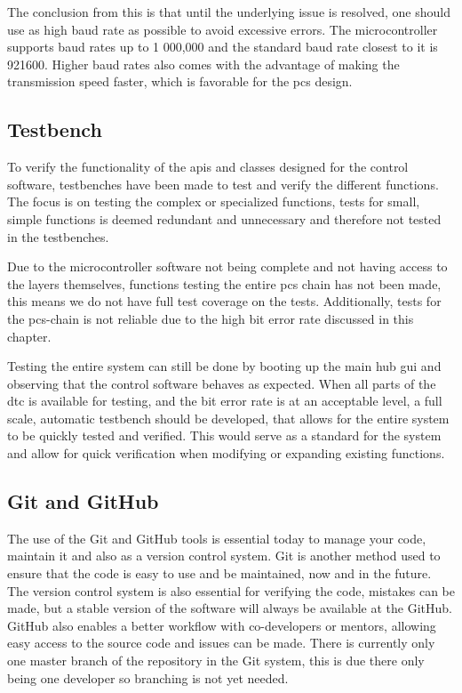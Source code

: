 \documentclass[main.tex]{subfiles}
\begin{document}
The conclusion from this is that until the underlying issue is resolved, one should use as high baud rate as possible to avoid excessive errors. The microcontroller supports baud rates up to 1 000,000 and the standard baud rate closest to it is 921600. Higher baud rates also comes with the advantage of making the transmission speed faster, which is favorable for the \gls{pcs} design.

\subsection{Testbench}

To verify the functionality of the \gls{api}s and classes designed for the control software, testbenches have been made to test and verify the different functions. The focus is on testing the complex or specialized functions, tests for small, simple functions is deemed redundant and unnecessary and therefore not tested in the testbenches.

Due to the microcontroller software not being complete and not having access to the layers themselves, functions testing the entire \gls{pcs} chain has not been made, this means we do not have full test coverage on the tests. Additionally, tests for the \gls{pcs}-chain is not reliable due to the high bit error rate discussed in this chapter.

Testing the entire system can still be done by booting up the main hub \gls{gui} and observing that the control software behaves as expected. When all parts of the \gls{dtc} is available for testing, and the bit error rate is at an acceptable level, a full scale, automatic testbench should be developed, that allows for the entire system to be quickly tested and verified. This would serve as a standard for the system and allow for quick verification when modifying or expanding existing functions.

\subsection{Git and GitHub}

The use of the Git and GitHub tools is essential today to manage your code, maintain it and also as a version control system. Git is another method used to ensure that the code is easy to use and be maintained, now and in the future. The version control system is also essential for verifying the code, mistakes can be made, but a stable version of the software will always be available at the GitHub. GitHub also enables a better workflow with co-developers or mentors, allowing easy access to the source code and issues can be made. There is currently only one master branch of the repository in the Git system, this is due there only being one developer so branching is not yet needed.
\end{document}
